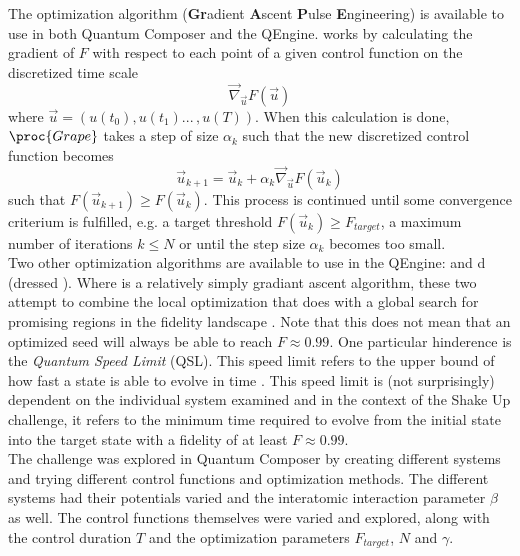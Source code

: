 \documentclass[a4paper, twocolumn]{revtex4-1}
\begin{document}
The optimization algorithm  (\textbf{Gr}adient \textbf Ascent \textbf Pulse \textbf Engineering) \cite{PhysRevA.90.033628} is available to use in both Quantum Composer and the QEngine.  works by calculating the gradient of $F$ with respect to each point of a given control function on the discretized time scale 
\begin{equation}
	\vec{\nabla}_{\vec{u}}F(\vec{u})
\end{equation}
where $\vec{u} = (u(t_0), u(t_1) ... \,, u(T))$. When this calculation is done, $\proc{Grape}$ takes a step of size $\alpha_k$ such that the new discretized control function becomes
\begin{equation}
	\vec{u}_{k+1} = \vec{u}_{k} + \alpha_k \vec{\nabla}_{\vec{u}}F(\vec{u}_k)
\end{equation}
such that $F(\vec{u}_{k+1}) \geq F(\vec{u}_{k})$. This process is continued until some convergence criterium is fulfilled, e.g. a target threshold $F(\vec{u}_{k}) \geq F_{target}$, a maximum number of iterations $k \leq N$ or until the step size $\alpha_k$ becomes too small. \\

Two other optimization algorithms are available to use in the QEngine:  and d (dressed ). Where  is a relatively simply gradiant ascent algorithm, these two attempt to combine the local optimization that  does with a global search for promising regions in the fidelity landscape \cite{GroupPaper, QEngine}. 
Note that this does not mean that an optimized seed will always be able to reach $F\approx0.99$. One particular hinderence is the \textit{Quantum Speed Limit} (QSL). This speed limit refers to the upper bound of how fast a state is able to evolve in time \cite{Deffner_2017}. This speed limit is (not surprisingly) dependent on the individual system examined and in the context of the Shake Up challenge, it refers to the minimum time required to evolve from the initial state into the target state with a fidelity of at least $F\approx 0.99$. \\

The challenge was explored in Quantum Composer by creating different systems and trying different control functions and optimization methods. The different systems had their potentials varied and the interatomic interaction parameter $\beta$ as well. The control functions themselves were varied and explored, along with the control duration $T$ and the  optimization parameters $F_{target}$, $N$ and $\gamma$.
\end{document}
